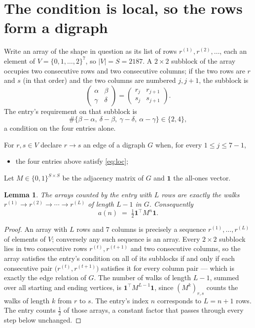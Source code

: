 \documentclass[11pt,a4paper]{article}
\theoremstyle{plain}
\newtheorem{lemma}[theorem]{Lemma}
\theoremstyle{definition}
\begin{document}
\section{The condition is local, so the rows form a digraph}

Write an array of the shape in question as its list of rows
$r^{(1)},r^{(2)},\dots$, each an element of
$V=\{0,1,\dots,2\}^{7}$, so $|V|=S=2187$. A $2\times2$ subblock of the array
occupies two consecutive rows and two consecutive columns; if the two rows are $r$
and $s$ (in that order) and the two columns are numbered $j,j+1$,
the subblock is
\[
\begin{pmatrix}\alpha&\beta\\\gamma&\delta\end{pmatrix}=\begin{pmatrix}r_j&r_{j+1}\\s_j&s_{j+1}\end{pmatrix}.
\]
The entry's requirement on that subblock is
\begin{equation}\label{eq:loc}
\#\{\beta-\alpha,\ \delta-\beta,\ \gamma-\delta,\ \alpha-\gamma\}\in\{2,4\},
\end{equation}
a condition on the four entries alone.

For $r,s\in V$ declare $r\to s$ an edge of a digraph $G$ when, for every
$1\le j\le 7-1$,
\begin{itemize}
\item the four entries above satisfy \eqref{eq:loc};

\end{itemize}
Let $M\in\{0,1\}^{S\times S}$ be the adjacency matrix of $G$ and $\mathbf{1}$ the
all-ones vector.

\begin{lemma}\label{lem:walk}
The arrays counted by the entry with $L$ rows are exactly the walks
$r^{(1)}\to r^{(2)}\to\cdots\to r^{(L)}$ of length $L-1$ in $G$. Consequently
\[
a(n)\;=\;\tfrac1{2}\mathbf{1}^{\!\top}M^{n}\mathbf{1} .
\]
\end{lemma}

\begin{proof}
An array with $L$ rows and $7$ columns is precisely a sequence
$r^{(1)},\dots,r^{(L)}$ of elements of $V$; conversely any such sequence is an array.
Every $2\times2$ subblock lies in two consecutive rows $r^{(t)},r^{(t+1)}$ and two
consecutive columns, so the array satisfies the entry's condition on all of its subblocks
if and only if each consecutive pair $\bigl(r^{(t)},r^{(t+1)}\bigr)$ satisfies it for
every column pair --- which is exactly the edge relation of $G$. The number of walks of
length $L-1$, summed over all starting and ending vertices, is
$\mathbf{1}^{\!\top}M^{L-1}\mathbf{1}$, since $(M^{k})_{r,s}$ counts the walks of
length $k$ from $r$ to $s$. The entry's index $n$ corresponds to $L=n+1$ rows. The entry counts $\tfrac1{2}$ of those arrays, a constant factor that passes through every step below unchanged.
\end{proof}
\end{document}
